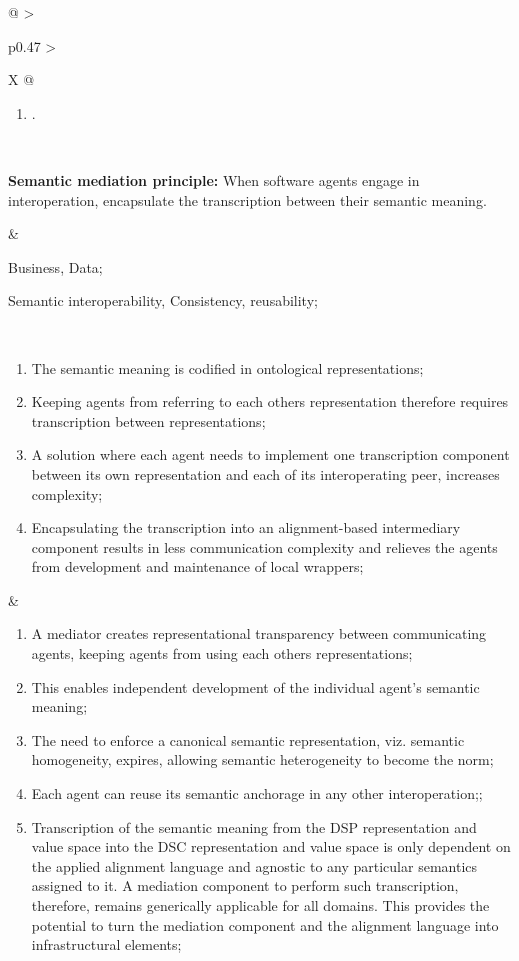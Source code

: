 \begin{xltabular}[l]{\linewidth}{@{} >{\small\raggedright\arraybackslash}p{0.47\linewidth} >{\small\raggedright\arraybackslash}X @{}}
\begin{enumerate}[left=10pt, nosep]
  \item .
\end{enumerate} \\
%
%
%
\begin{mmdp}\label{dp:mediation}{\bfseries Semantic mediation principle:}
\quad When software agents engage in interoperation, encapsulate the transcription between their semantic meaning.\end{mmdp}
&
\begin{description}[labelwidth=3.7cm,leftmargin=3.7cm+1ex,nosep,topsep=2ex,labelsep=1ex,font=\bfseries]
\item[Type of information:] Business, Data;
\item[Quality attributes:] Semantic interoperability, Consistency, reusability;
\end{description} \\
\begin{enumerate}[left=6pt, nosep]
  \item The semantic meaning is codified in ontological representations;
  \item Keeping agents from referring to each others representation therefore requires transcription between representations;
  \item A solution where each agent needs to implement one transcription component between its own representation and each of its interoperating peer, increases complexity;
  \item Encapsulating the transcription into an alignment-based intermediary component results in less communication complexity and relieves the agents from development and maintenance of local wrappers;
\end{enumerate}
&
\begin{enumerate}[left=10pt, nosep]
  \item A mediator creates representational transparency between communicating agents, keeping agents from using each others representations;
  \item This enables independent development of the individual agent’s semantic meaning;
  \item The need to enforce a canonical semantic representation, viz. semantic homogeneity, expires, allowing semantic heterogeneity to become the norm;
  \item Each agent can reuse its semantic anchorage in any other interoperation;;
  \item Transcription of the semantic meaning from the DSP representation and value space into the DSC representation and value space is only dependent on the applied alignment language and agnostic to any particular semantics assigned to it. A mediation component to perform such transcription, therefore, remains generically applicable for all domains. This provides the potential to turn the mediation component and the alignment language into infrastructural elements;

\end{enumerate}
\end{xltabular}
